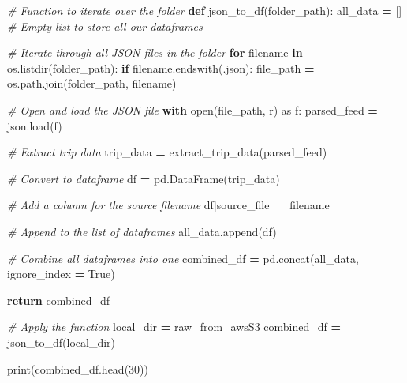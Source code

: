 \documentclass[
  12pt,
]{article}
\newenvironment{Shaded}{\begin{snugshade}}{\end{snugshade}}
\newcommand{\BuiltInTok}[1]{#1}
\newcommand{\CommentTok}[1]{\textcolor[rgb]{0.56,0.35,0.01}{\textit{#1}}}
\newcommand{\ControlFlowTok}[1]{\textcolor[rgb]{0.13,0.29,0.53}{\textbf{#1}}}
\newcommand{\DecValTok}[1]{\textcolor[rgb]{0.00,0.00,0.81}{#1}}
\newcommand{\ImportTok}[1]{#1}
\newcommand{\KeywordTok}[1]{\textcolor[rgb]{0.13,0.29,0.53}{\textbf{#1}}}
\newcommand{\NormalTok}[1]{#1}
\newcommand{\OperatorTok}[1]{\textcolor[rgb]{0.81,0.36,0.00}{\textbf{#1}}}
\newcommand{\StringTok}[1]{\textcolor[rgb]{0.31,0.60,0.02}{#1}}
\newcommand{\VariableTok}[1]{\textcolor[rgb]{0.00,0.00,0.00}{#1}}
\begin{document}
\begin{Shaded}
\begin{Highlighting}[]
\CommentTok{\# Function to iterate over the folder}
\KeywordTok{def}\NormalTok{ json\_to\_df(folder\_path):}
\NormalTok{    all\_data }\OperatorTok{=}\NormalTok{ [] }\CommentTok{\# Empty list to store all our dataframes}

    \CommentTok{\# Iterate through all JSON files in the folder}
    \ControlFlowTok{for}\NormalTok{ filename }\KeywordTok{in}\NormalTok{ os.listdir(folder\_path):}
        \ControlFlowTok{if}\NormalTok{ filename.endswith(}\StringTok{\textquotesingle{}.json\textquotesingle{}}\NormalTok{): }
\NormalTok{            file\_path }\OperatorTok{=}\NormalTok{ os.path.join(folder\_path, filename)}

            \CommentTok{\# Open and load the JSON file}
            \ControlFlowTok{with} \BuiltInTok{open}\NormalTok{(file\_path, }\StringTok{\textquotesingle{}r\textquotesingle{}}\NormalTok{) }\ImportTok{as}\NormalTok{ f:}
\NormalTok{                parsed\_feed }\OperatorTok{=}\NormalTok{ json.load(f)}

            \CommentTok{\# Extract trip data}
\NormalTok{            trip\_data }\OperatorTok{=}\NormalTok{ extract\_trip\_data(parsed\_feed)}

            \CommentTok{\# Convert to dataframe}
\NormalTok{            df }\OperatorTok{=}\NormalTok{ pd.DataFrame(trip\_data)}

            \CommentTok{\# Add a column for the source filename}
\NormalTok{            df[}\StringTok{\textquotesingle{}source\_file\textquotesingle{}}\NormalTok{] }\OperatorTok{=}\NormalTok{ filename}

            \CommentTok{\# Append to the list of dataframes}
\NormalTok{            all\_data.append(df)}

    \CommentTok{\# Combine all dataframes into one}
\NormalTok{    combined\_df }\OperatorTok{=}\NormalTok{ pd.concat(all\_data, ignore\_index }\OperatorTok{=} \VariableTok{True}\NormalTok{)}

    \ControlFlowTok{return}\NormalTok{ combined\_df}
    
\CommentTok{\# Apply the function}
\NormalTok{local\_dir }\OperatorTok{=} \StringTok{\textquotesingle{}raw\_from\_awsS3\textquotesingle{}}
\NormalTok{combined\_df }\OperatorTok{=}\NormalTok{ json\_to\_df(local\_dir)}

\BuiltInTok{print}\NormalTok{(combined\_df.head(}\DecValTok{30}\NormalTok{))}
\end{Highlighting}
\end{Shaded}
\end{document}
